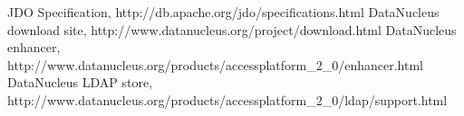 \documentclass[a4paper,11pt,oneside]{article}
\begin{document}
\begin{thebibliography}{0}
JDO Specification, http://db.apache.org/jdo/specifications.html
DataNucleus download site, http://www.datanucleus.org/project/download.html
DataNucleus enhancer, http://www.datanucleus.org/products/accessplatform\_2\_0/enhancer.html
DataNucleus LDAP store, http://www.datanucleus.org/products/accessplatform\_2\_0/ldap/support.html
\end{thebibliography}
\end{document}
